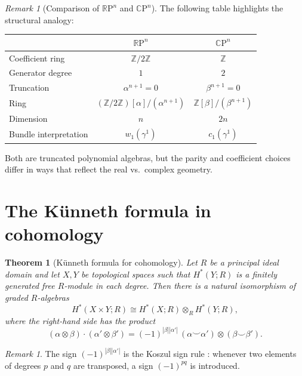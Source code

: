 \documentclass[12pt,a4paper,openany]{book}
\theoremstyle{definition}
\theoremstyle{plain}
\newtheorem{theorem}[definition]{Theorem}
\theoremstyle{remark}
\newtheorem{remark}[definition]{Remark}
\newcommand{\Z}{\mathbb{Z}}
\newcommand{\RP}{\mathbb{R}\mathrm{P}}
\newcommand{\CP}{\mathbb{C}\mathrm{P}}
\newcommand{\abs}[1]{\left|#1\right|}
\begin{document}
\begin{remark}[Comparison of $\RP^n$ and $\CP^n$]
The following table highlights the structural analogy:
\begin{center}
\renewcommand{\arraystretch}{1.2}
\begin{tabular}{lcc}
\toprule
& $\RP^n$ & $\CP^n$ \\
\midrule
Coefficient ring & $\Z/2\Z$ & $\Z$ \\
Generator degree & $1$ & $2$ \\
Truncation & $\alpha^{n+1}=0$ & $\beta^{n+1}=0$ \\
Ring & $(\Z/2\Z)[\alpha]/(\alpha^{n+1})$ & $\Z[\beta]/(\beta^{n+1})$ \\
Dimension & $n$ & $2n$ \\
Bundle interpretation & $w_1(\gamma^1)$ & $c_1(\gamma^1)$ \\
\bottomrule
\end{tabular}
\end{center}
Both are truncated polynomial algebras, but the parity and coefficient
choices differ in ways that reflect the real vs.\ complex geometry.
\end{remark}

\section{The K\"unneth formula in cohomology}
\label{sec:kunneth-cohomology}

\begin{theorem}[K\"unneth formula for cohomology]
\label{thm:kunneth-cohomology}
Let $R$ be a principal ideal domain and let $X,Y$ be topological spaces
such that $H^*(Y;R)$ is a finitely generated free $R$-module in each
degree. Then there is a natural isomorphism of graded $R$-algebras
\[
  H^*(X\times Y;R) \cong H^*(X;R)\otimes_R H^*(Y;R),
\]
where the right-hand side has the product
\[
  (\alpha\otimes\beta)\cdot(\alpha'\otimes\beta')
  = (-1)^{\abs{\beta}\abs{\alpha'}}\,
    (\alpha\smile\alpha')\otimes(\beta\smile\beta').
\]
\end{theorem}

\begin{remark}
The sign $(-1)^{\abs{\beta}\abs{\alpha'}}$ is the Koszul sign rule%
: whenever two elements of degrees $p$ and $q$
are transposed, a sign $(-1)^{pq}$ is introduced.
\end{remark}
\end{document}
